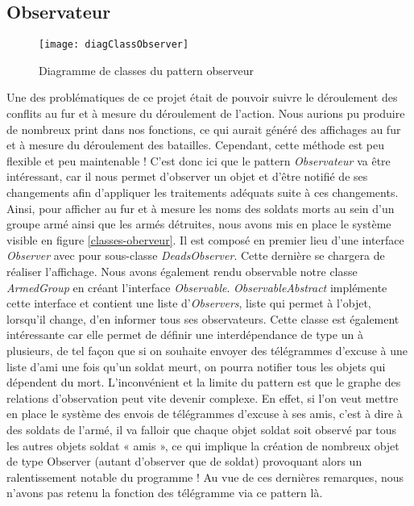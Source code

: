 \subsection{Observateur}
\begin{figure}[h]
\begin{center}
    \texttt{[image: diagClassObserver]}
\end{center}
    \caption{Diagramme de classes du pattern observeur}
    \label{classes-oberveur}
\end{figure}

Une des problématiques de ce projet était de pouvoir suivre le déroulement des conflits au fur et à mesure du déroulement de l’action. Nous aurions pu produire de nombreux print dans nos fonctions, ce qui aurait généré des affichages au fur et à mesure du déroulement des batailles. Cependant, cette méthode est peu flexible et peu maintenable ! 
C'est donc ici que le pattern \emph{Observateur} va être intéressant, car il nous permet d'observer un objet et d'être notifié de ses changements afin d'appliquer les traitements adéquats suite à ces changements. 
Ainsi, pour afficher au fur et à mesure les noms des soldats morts au sein d'un groupe armé ainsi que les armés détruites, nous avons mis en place le système visible en figure \vref{classes-oberveur}. Il est composé en premier lieu d'une interface \emph{Observer} avec pour sous-classe \emph{DeadsObserver}. Cette dernière se chargera de réaliser l'affichage. Nous avons également rendu observable notre classe \emph{ArmedGroup} en créant l'interface \emph{Observable}. \emph{ObservableAbstract} implémente cette interface et contient une liste d'\emph{Observers}, liste qui permet à l'objet, lorsqu'il change, d'en informer tous ses observateurs. 
Cette classe est également intéressante car elle permet de définir une interdépendance de type un à plusieurs, de tel façon que si on souhaite envoyer des télégrammes d’excuse à une liste d'ami une fois qu'un soldat meurt, on pourra notifier tous les objets qui dépendent du mort. L'inconvénient et la limite du pattern est que le graphe des relations d'observation peut vite devenir complexe. En effet, si l'on veut mettre en place le système des envois de télégrammes d’excuse à ses amis, c'est à dire à des soldats de l'armé, il va falloir que chaque objet soldat soit observé par tous les autres objets soldat « amis », ce qui implique la création de nombreux objet de type Observer (autant d'observer que de soldat) provoquant alors un ralentissement notable du programme ! Au vue de ces dernières remarques, nous n'avons pas retenu la fonction des télégramme via ce pattern là.